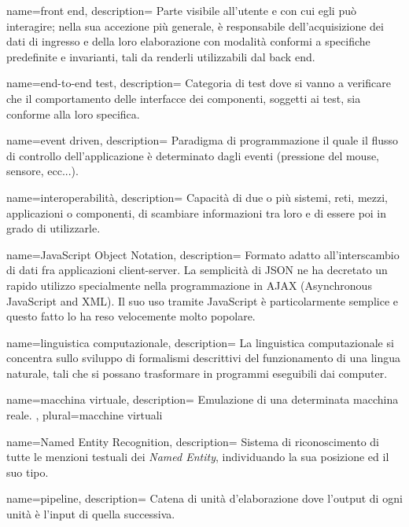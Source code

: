  {
name=front end,
description={
Parte visibile all’utente e con cui egli può interagire; nella sua accezione più
generale, è responsabile dell’acquisizione dei dati di ingresso e della loro
elaborazione con modalità conformi a specifiche predefinite e invarianti, tali
da renderli utilizzabili dal back end.
}
}

 {
name=end-to-end test,
description={
Categoria di test dove si vanno a verificare che il comportamento delle
interfacce dei componenti, soggetti ai test, sia conforme alla loro specifica.
}
}

 {
name=event driven,
description={
Paradigma di programmazione il quale il flusso di controllo dell'applicazione è
determinato dagli eventi (pressione del mouse, sensore, ecc...).
}
}

 {
name=interoperabilità,
description={
Capacità di due o più sistemi, reti, mezzi, applicazioni o componenti, di
scambiare informazioni tra loro e di essere poi in grado di utilizzarle.
}
}

 {
name=JavaScript Object Notation,
description={
Formato adatto all’interscambio di dati fra applicazioni client-server. La
semplicità di JSON ne ha decretato un rapido utilizzo specialmente nella
programmazione in AJAX (Asynchronous JavaScript and XML). Il suo uso tramite
JavaScript è particolarmente semplice e questo fatto lo ha reso velocemente
molto popolare.
}
}

 {
name=linguistica computazionale,
description={
La linguistica computazionale si concentra sullo sviluppo di formalismi
descrittivi del funzionamento di una lingua naturale, tali che si possano
trasformare in programmi eseguibili dai computer.
}
}

 {
name=macchina virtuale,
description={
Emulazione di una determinata macchina reale.
},
plural=macchine virtuali
}

 {
name=Named Entity Recognition,
description={
Sistema di riconoscimento di tutte le menzioni testuali dei
\textit{Named Entity}, individuando la sua posizione ed il suo tipo.
}
}

 {
name=pipeline,
description={
Catena di unità d'elaborazione dove l'output di ogni unità è l'input di quella
successiva.
}
}

